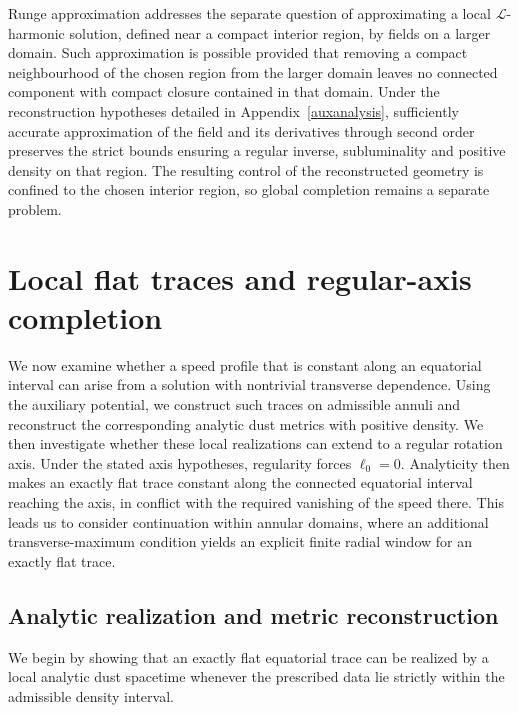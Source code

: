 \documentclass[amsmath,amsfonts,amssymb,aps,pra,superscriptaddress,10pt]{revtex4-2}
\numberwithin{equation}{section}
\theoremstyle{plain}
\theoremstyle{definition}
\theoremstyle{remark}
\theoremstyle{definition}
\newcommand{\ellzero}{\ell_0}
\begin{document}
Runge approximation addresses the separate question of approximating a local $\mathcal{L}$-harmonic solution, defined near a compact interior region, by fields on a larger domain. Such approximation is possible provided that removing a compact neighbourhood of the chosen region from the larger domain leaves no connected component with compact closure contained in that domain. Under the reconstruction hypotheses detailed in Appendix~\ref{auxanalysis}, sufficiently accurate approximation of the field and its derivatives through second order preserves the strict bounds ensuring a regular inverse, subluminality and positive density on that region. The resulting control of the reconstructed geometry is confined to the chosen interior region, so global completion remains a separate problem.



\section{Local flat traces and regular-axis completion}\label{exactflattraces}

We now examine whether a speed profile that is constant along an equatorial interval can arise from a solution with nontrivial transverse dependence. Using the auxiliary potential, we construct such traces on admissible annuli and reconstruct the corresponding analytic dust metrics with positive density. We then investigate whether these local realizations can extend to a regular rotation axis. Under the stated axis hypotheses, regularity forces $\ellzero=0$. Analyticity then makes an exactly flat trace constant along the connected equatorial interval reaching the axis, in conflict with the required vanishing of the speed there. This leads us to consider continuation within annular domains, where an additional transverse-maximum condition yields an explicit finite radial window for an exactly flat trace.

\subsection{Analytic realization and metric reconstruction}

We begin by showing that an exactly flat equatorial trace can be realized by a local analytic dust spacetime whenever the prescribed data lie strictly within the admissible density interval.
\end{document}
